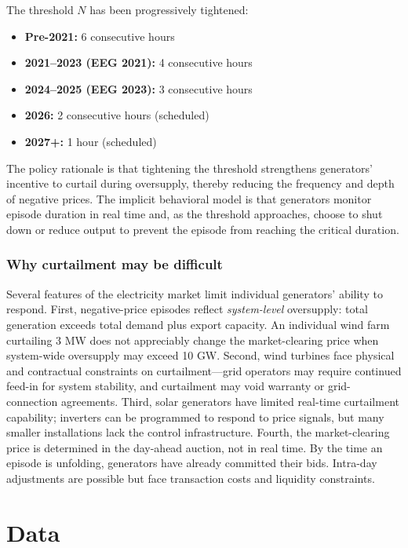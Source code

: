 \documentclass[12pt]{article}
\begin{document}
The threshold $N$ has been progressively tightened:
\begin{itemize}
\item \textbf{Pre-2021:} 6 consecutive hours
\item \textbf{2021--2023 (EEG 2021):} 4 consecutive hours
\item \textbf{2024--2025 (EEG 2023):} 3 consecutive hours
\item \textbf{2026:} 2 consecutive hours (scheduled)
\item \textbf{2027+:} 1 hour (scheduled)
\end{itemize}

The policy rationale is that tightening the threshold strengthens generators' incentive to curtail during oversupply, thereby reducing the frequency and depth of negative prices. The implicit behavioral model is that generators monitor episode duration in real time and, as the threshold approaches, choose to shut down or reduce output to prevent the episode from reaching the critical duration.

\subsubsection*{Why curtailment may be difficult} Several features of the electricity market limit individual generators' ability to respond. First, negative-price episodes reflect \emph{system-level} oversupply: total generation exceeds total demand plus export capacity. An individual wind farm curtailing 3 MW does not appreciably change the market-clearing price when system-wide oversupply may exceed 10 GW. Second, wind turbines face physical and contractual constraints on curtailment---grid operators may require continued feed-in for system stability, and curtailment may void warranty or grid-connection agreements. Third, solar generators have limited real-time curtailment capability; inverters can be programmed to respond to price signals, but many smaller installations lack the control infrastructure. Fourth, the market-clearing price is determined in the day-ahead auction, not in real time. By the time an episode is unfolding, generators have already committed their bids. Intra-day adjustments are possible but face transaction costs and liquidity constraints.


\section{Data}
\label{sec:data}
\end{document}
